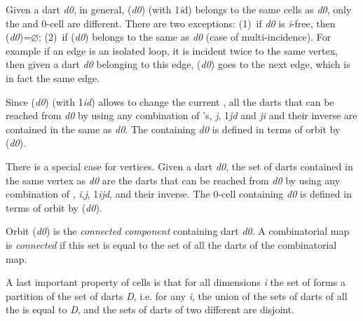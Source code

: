 Given a dart \emph{d0}, in general, \betai{}(\emph{d0}) (with 1\myleq{}\emph{i}\myleq{}d)
belongs to the same cells as \emph{d0}, only the  and 0-cell are
different.  There are two exceptions: (1)~if \emph{d0} is \emph{i}-free, then
\betai{}(\emph{d0})=$\varnothing$; (2)~if \betai{}(\emph{d0}) belongs to the same 
as \emph{d0} (case of multi-incidence). For example if an edge is an isolated
loop, it is incident twice to the same vertex, then given a dart \emph{d0}
belonging to this edge, \betaun{}(\emph{d0}) goes to the next edge, which is in
fact the same edge.

Since \betai{}(\emph{d0}) (with 1\myleq{}\emph{i}\myleq{}\emph{d}) allows to change the
current , all the darts that can be reached from \emph{d0} by
using any combination of \betaj{}'s, \myforall{}\emph{j}, 1\myleq{}\emph{j}\myleq{}\emph{d} and
\emph{j}\myneq{}\emph{i} and their inverse are contained in the same  as
\emph{d0}.  The  containing \emph{d0} is defined in terms of orbit by
\orbit{\betaun{},\myldots{},\betaimun{},\betaipun{},\myldots{},\betad{}}(\emph{d0}).

There is a special case for vertices. Given a dart \emph{d0}, the set of
darts contained in the same vertex as \emph{d0} are the darts that can be
reached from \emph{d0} by using any combination of \betai{}\comp{}\betaj{},
\myforall{}\emph{i},\emph{j}, 1\myleq{}\emph{i}\mylt{}\emph{j}\myleq{}\emph{d}, and their inverse.  The 0-cell
containing \emph{d0} is defined in terms of orbit by
(\emph{d0}).

Orbit \orbit{\betaun{},\myldots{},\betad{}}(\emph{d0}) is the \emph{connected
  component} containing dart \emph{d0}. A combinatorial map is
\emph{connected} if this set is equal to the set of all the darts
of the combinatorial map.

%

A last important property of cells is that for all dimensions \emph{i} the
set of  forms a partition of the set of darts \emph{D}, i.e.  for
any \emph{i}, the union of the sets of darts of all the  is equal
to \emph{D}, and the sets of darts of two different  are disjoint.

